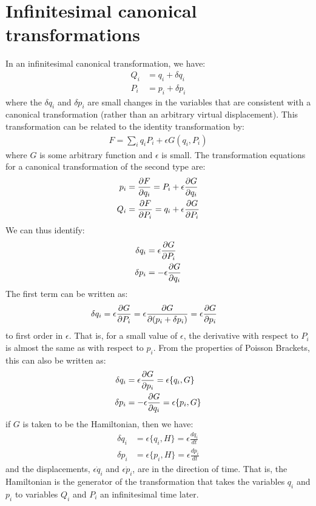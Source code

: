 \section{Infinitesimal canonical transformations}
In an infinitesimal canonical transformation, we have:
\begin{align}
Q_i&=q_i+\delta q_i\\
P_i&=p_i+\delta p_i
\end{align}
where the $\delta q_i$ and $\delta p_i$ are small changes in the variables that are consistent with a canonical transformation (rather than an arbitrary virtual displacement).
This transformation can be related to the identity transformation by:
\begin{align}
F=\sum_iq_iP_i+\epsilon G(q_i,P_i)
\end{align}
where $G$ is some arbitrary function and $\epsilon$ is small. The transformation equations for a canonical transformation of the second type are:
\begin{align}
p_i&=\frac{\partial F}{\partial q_i}=P_i+\epsilon\frac{\partial G}{\partial q_i}\nonumber\\
Q_i&=\frac{\partial F}{\partial P_i}=q_i+\epsilon\frac{\partial G}{\partial P_i}
\end{align}
We can thus identify:
\begin{align}
\delta q_i&=\epsilon\frac{\partial G}{\partial P_i}\nonumber\\
\delta p_i&=-\epsilon\frac{\partial G}{\partial q_i}
\end{align}
The first term can be written as:
\begin{align}
\delta q_i&=\epsilon\frac{\partial G}{\partial P_i}=\epsilon\frac{\partial G}{\partial (p_i+\delta p_i)}=\epsilon\frac{\partial G}{\partial p_i}
\end{align}
to first order in $\epsilon$. That is, for a small value of $\epsilon$, the derivative with respect to $P_i$ is almost the same as with respect to $p_i$.
From the properties of Poisson Brackets, this can also be written as:
\begin{align}
\delta q_i&=\epsilon\frac{\partial G}{\partial p_i}=\epsilon\{q_i,G\}\nonumber\\
\delta p_i&=-\epsilon\frac{\partial G}{\partial q_i}=\epsilon\{p_i,G\}
\end{align}
if $G$ is taken to be the Hamiltonian, then we have:
\begin{align}
\delta q_i&=\epsilon\{q_i,H\}=\epsilon\frac{dq_i}{dt}\nonumber\\
\delta p_i&=\epsilon\{p_i,H\}=\epsilon\frac{dp_i}{dt}
\end{align}
and the displacements, $\epsilon\dot q_i$ and $\epsilon\dot p_i$, are in the direction of time. That is, the Hamiltonian is the generator of the transformation that takes the variables $q_i$ and $p_i$ to variables $Q_i$ and $P_i$ an infinitesimal time later. 



